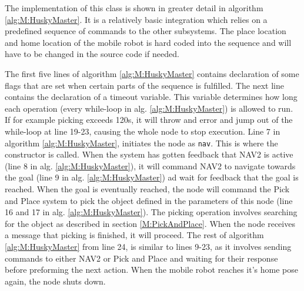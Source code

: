 The implementation of this class is shown in greater detail in algorithm \ref{alg:M:HuskyMaster}. It is a relatively basic integration which relies on a predefined sequence of commands to the other subsystems. The place location and home location of the mobile robot is hard coded into the sequence and will have to be changed in the source code if needed.
 


The first five lines of algorithm \ref{alg:M:HuskyMaster} contains declaration of some flags that are set when certain parts of the sequence is fulfilled. The next line contains the declaration of a timeout variable. This variable determines how long each operation (every while-loop in alg. \ref{alg:M:HuskyMaster}) is allowed to run. If for example picking exceeds 120s, it will throw and error and jump out of the while-loop at line 19-23, causing the whole node to stop execution.  Line 7 in algorithm \ref{alg:M:HuskyMaster}, initiates the node as \lstinline{nav}. This is where the constructor is called. When the system has gotten feedback that NAV2 is active (line 8 in alg. \ref{alg:M:HuskyMaster}), it will command NAV2 to navigate towards the goal (line 9 in alg. \ref{alg:M:HuskyMaster}) ad wait for feedback that the goal is reached. When the goal is eventually reached, the node will command the Pick and Place system to pick the object defined in the parameters of this node (line 16 and 17 in alg. \ref{alg:M:HuskyMaster}). The picking operation involves searching for the object as described in section \ref{M:PickAndPlace}. When the node receives a message that picking is finished, it will proceed. The rest of algorithm \ref{alg:M:HuskyMaster} from line 24, is similar to lines 9-23, as it involves sending commands to either NAV2 or Pick and Place and waiting for their response before preforming the next action. When the mobile robot reaches it's home pose again, the node shuts down.

